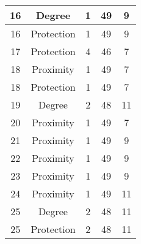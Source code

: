\documentclass[results.tex]{subfiles}
\begin{document}
\begin{center}
\begin{tabular}{| c || c | c | c | c |}
            \hline
            16                      & Degree                       & 1                      & 49                      & 9                    \\
            \hline
            16                      & Protection                   & 1                      & 49                      & 9                    \\
            \hline
            17                      & Protection                   & 4                      & 46                      & 7                    \\
            \hline
            18                      & Proximity                    & 1                      & 49                      & 7                    \\
            \hline
            18                      & Protection                   & 1                      & 49                      & 7                    \\
            \hline
            19                      & Degree                       & 2                      & 48                      & 11                   \\
            \hline
            20                      & Proximity                    & 1                      & 49                      & 7                    \\
            \hline
            21                      & Proximity                    & 1                      & 49                      & 9                    \\
            \hline
            22                      & Proximity                    & 1                      & 49                      & 9                    \\
            \hline
            23                      & Proximity                    & 1                      & 49                      & 9                    \\
            \hline
            24                      & Proximity                    & 1                      & 49                      & 11                   \\
            \hline
            25                      & Degree                       & 2                      & 48                      & 11                   \\
            \hline
            25                      & Protection                   & 2                      & 48                      & 11                   \\

\end{tabular}
\end{center}
\end{document}
